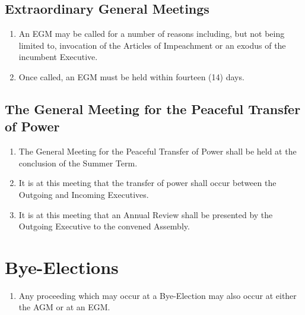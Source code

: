 \documentclass{scrartcl}
\begin{document}
        \subsection{Extraordinary General Meetings}
            \label{gm--egm}
            \begin{enumerate}
                \item An EGM may be called for a number of reasons including, but not being limited to, invocation of the Articles of Impeachment or an exodus of the incumbent Executive.
                \item Once called, an EGM must be held within fourteen (14) days.
            \end{enumerate}

        \subsection{The General Meeting for the Peaceful Transfer of Power}
            \label{gm--transfer}
            \begin{enumerate}
                \item The General Meeting for the Peaceful Transfer of Power shall be held at the conclusion of the Summer Term.
                \item It is at this meeting that the transfer of power shall occur between the Outgoing and Incoming Executives.
                \item It is at this meeting that an Annual Review shall be presented by the Outgoing Executive to the convened Assembly.
            \end{enumerate}

    \clearpage
    \section{Bye-Elections}
        \label{bye-election}
        \begin{enumerate}
            \item Any proceeding which may occur at a Bye-Election may also occur at either the AGM or at an EGM.
        \end{enumerate}
\end{document}

